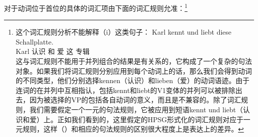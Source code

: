 对于动词位于首位的具体的词汇项由下面的词汇规则允准：\footnote{%
这个词汇规则分析不能解释（i）这类句子：
\ea
\gll Karl kennt und liebt diese Schallplatte.\\
	 Karl 认识 和 爱 这 专辑\\
\z
这与词汇规则不能用于并列组合的结果是有关系的，它构成了一个复杂的句法对象。如果我们将词汇规则分别应用到每个动词上的话，那么我们会得到动词的不同类型，他们分别选择kennen（认识）和lieben（爱）的动词语迹。由于连词的\catvsc 在并列中互相指认，包括kennt和liebt的V1变体的并列可以被排除出去，因为被选择的VP的\dslvsc 包括各自动词的意义，而且是不兼容的\citep[]{Mueller2005c}。除了词汇规则，我们需要假定一个一元的句法规则，它被应用到短语kennt und liebt（认识和爱）上。正如我们看到的，这里假定的HPSG形式化的词汇规则对应于一元规则，这样（）和相应的句法规则的区别很大程度上是表达上的差异。
}
\eas
\label{lr-verb-movement}
